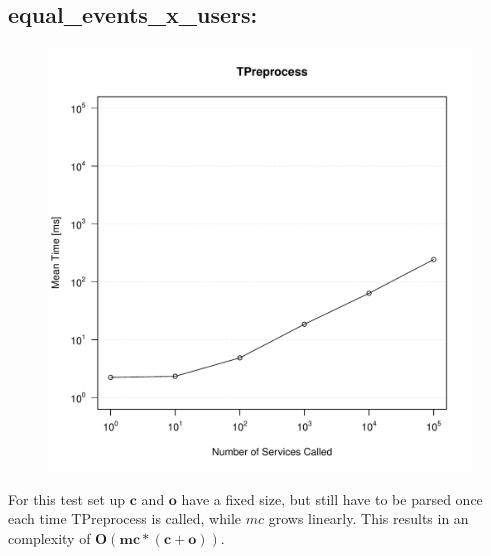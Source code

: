 \documentclass[10pt,a4paper]{article}
\begin{document}
\subsection{equal\_events\_x\_users:}
\begin{figure}[H]
	\centering
	\includegraphics[scale=0.7]{Grafiken/TPreprocess_equal_events_ms.pdf}
\end{figure}
For this test set up $\mathbf{c}$ and $\mathbf{o}$ have a fixed size, but still have to be parsed once each time TPreprocess is called, while $mc$ grows linearly. This results in an complexity of $\mathbf{O(mc * (c + o))}$.
\end{document}
